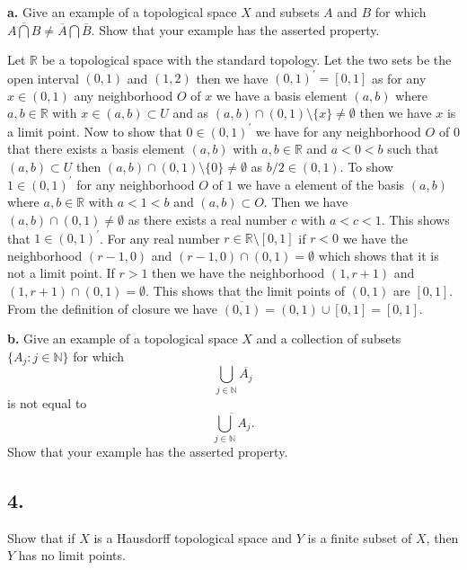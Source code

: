\documentclass{amsart}
\theoremstyle{plain}
\theoremstyle{definition}
\theoremstyle{remark}
\begin{document}
\vspace{.1in}
{\bfseries a.} Give an example of a topological space $X$ and subsets $A$ and $B$ for which $\overline{A\bigcap B} \ne \overline{A} \bigcap \overline{B}$. Show that your example has the asserted property. 

Let $\mathbb{R}$ be a topological space with the standard topology. Let the two sets be the open interval $(0,1)$ and $(1,2)$ then we have $(0,1)^\prime=[0,1]$ as for any $x\in (0,1)$ any neighborhood $O$ of $x$ we have a basis element $(a,b)$ where $a,b\in \mathbb{R}$ with $x\in (a,b)\subset U$ and as $(a,b)\cap (0,1)\setminus \{x\}\not = \emptyset$ then we have $x$ is a limit point. Now to show that $0\in (0,1)^\prime$ we have for any neighborhood $O$ of $0$ that there exists a basis element $(a,b)$ with $a,b\in \mathbb R$ and $a<0<b$ such that $(a,b)\subset U$ then $(a,b)\cap (0,1)\setminus \{0\}\not = \emptyset$ as $b/2\in (0,1)$. To show $1\in (0,1)^\prime$ for any neighborhood $O$ of $1$ we have a element of the basis $(a,b)$ where $a,b\in \mathbb{R}$ with $a<1<b$ and $(a,b)\subset O$. Then we have $(a,b)\cap (0,1)\not = \emptyset$ as there exists a real number $c$ with $a<c<1$. This shows that $1\in (0,1)^\prime$. For any real number $r\in \mathbb{R}\setminus [0,1]$ if $r<0$ we have the neighborhood $(r-1,0)$ and $(r-1,0)\cap (0,1)= \emptyset$ which shows that it is not a limit point. If $r>1$ then we have the neighborhood $(1,r+1)$ and $(1,r+1)\cap (0,1)=\emptyset$. This shows that the limit points of $(0,1)$ are $[0,1]$. From the definition of closure we have $\overline {(0,1)}= (0,1)\cup [0,1]=[0,1]$. 



\vspace{.1in}
{\bfseries b.} Give an example of a topological space $X$ and a collection of subsets $\{ A_j : j\in \mathbb N \}$ for which 
\[
\bigcup _{j\in \mathbb N } \overline{A_j}
\]
is not equal to 
\[
\overline{\bigcup _{j\in \mathbb N } A_j}.
\]
Show that your example has the asserted property. 

\vspace{.15in}

\noindent
\subsection*{4.}  Show that if $X$ is a Hausdorff topological space and $Y$ is a finite subset of $X$, then $Y$ has no limit points. 
\end{document}
